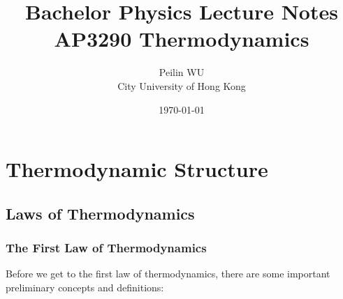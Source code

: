 \documentclass[UTF8]{book}
\newenvironment{theorem}[2][Theorem]{\begin{trivlist}
\item[\hskip \labelsep {\bfseries #1}\hskip \labelsep {\bfseries }]}{\end{trivlist}}
\begin{document}
\date{\today}

 
\title{ Bachelor Physics Lecture Notes\\ AP3290 Thermodynamics
}
\author{Peilin \textsc{WU}
 \\City University of Hong Kong
 } 
 
\maketitle
\tableofcontents
\pagebreak
\chapter{Thermodynamic Structure}

\section{Laws of Thermodynamics}
\subsection{The First Law of Thermodynamics}
 {Before we get to the first law of thermodynamics, there are some important preliminary concepts and definitions:}

\end{document}
